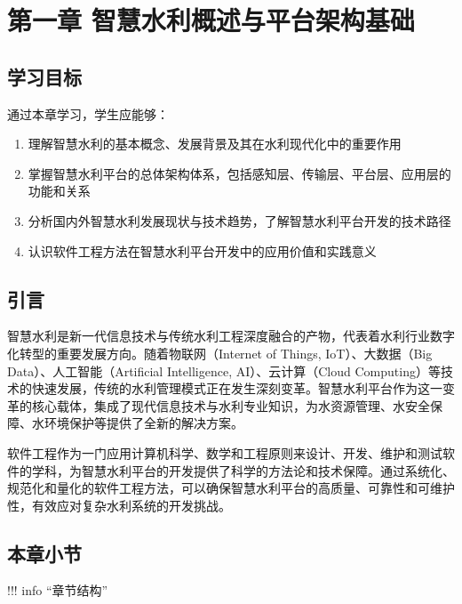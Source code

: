 \documentclass[12pt,a4paper]{article}
\providecommand{\tightlist}{%
  \setlength{\itemsep}{0pt}\setlength{\parskip}{0pt}}
\begin{document}
\section{第一章
智慧水利概述与平台架构基础}\label{ux7b2cux4e00ux7ae0-ux667aux6167ux6c34ux5229ux6982ux8ff0ux4e0eux5e73ux53f0ux67b6ux6784ux57faux7840}

\subsection{学习目标}\label{ux5b66ux4e60ux76eeux6807}

通过本章学习，学生应能够：

\begin{enumerate}
\def\labelenumi{\arabic{enumi}.}
\tightlist
\item
  理解智慧水利的基本概念、发展背景及其在水利现代化中的重要作用
\item
  掌握智慧水利平台的总体架构体系，包括感知层、传输层、平台层、应用层的功能和关系
\item
  分析国内外智慧水利发展现状与技术趋势，了解智慧水利平台开发的技术路径
\item
  认识软件工程方法在智慧水利平台开发中的应用价值和实践意义
\end{enumerate}

\subsection{引言}\label{ux5f15ux8a00}

智慧水利是新一代信息技术与传统水利工程深度融合的产物，代表着水利行业数字化转型的重要发展方向。随着物联网（Internet
of Things, IoT）、大数据（Big Data）、人工智能（Artificial Intelligence,
AI）、云计算（Cloud
Computing）等技术的快速发展，传统的水利管理模式正在发生深刻变革。智慧水利平台作为这一变革的核心载体，集成了现代信息技术与水利专业知识，为水资源管理、水安全保障、水环境保护等提供了全新的解决方案。

软件工程作为一门应用计算机科学、数学和工程原则来设计、开发、维护和测试软件的学科，为智慧水利平台的开发提供了科学的方法论和技术保障。通过系统化、规范化和量化的软件工程方法，可以确保智慧水利平台的高质量、可靠性和可维护性，有效应对复杂水利系统的开发挑战。

\subsection{本章小节}\label{ux672cux7ae0ux5c0fux8282}

!!! info ``章节结构''
\end{document}

